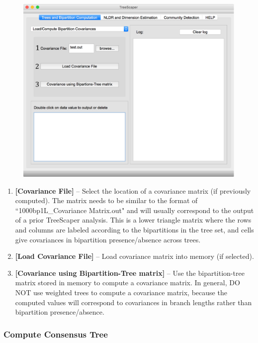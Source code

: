 \documentclass[11pt]{article}
\begin{document}
\begin{figure}[thbp!]\centering
\includegraphics[scale=0.4]{imagesForManual/Figure8_6_1_3.png}
\end{figure}

\begin{enumerate}[{\bf 1-}]
\item {\bf [Covariance File]} --  Select the location of a covariance matrix (if previously computed).
The matrix needs to be similar to the format of ``1000bp1L\_Covariance Matrix.out" and will
usually correspond to the output of a prior TreeScaper analysis. This is a lower triangle
matrix where the rows and columns are labeled according to the bipartitions in the tree set,
and cells give covariances in bipartition presence/absence across trees.

\item {\bf [Load Covariance File]} -- Load covariance matrix into memory (if selected).

\item {\bf [Covariance using Bipartition-Tree matrix]} -- Use the bipartition-tree matrix stored in
memory to compute a covariance matrix. In general, DO NOT use weighted trees to compute
a covariance matrix, because the computed values will correspond to covariances in branch
lengths rather than bipartition presence/absence.
\end{enumerate}

\newpage
\subsubsection{Compute Consensus Tree}\label{subsubsect:CompConsensusTree}
\end{document}
